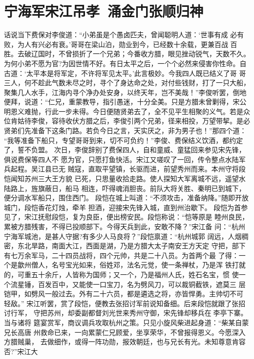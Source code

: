 \chapter{宁海军宋江吊孝~涌金门张顺归神}

话说当下费保对李俊道：“小弟虽是个愚卤匹夫，曾闻聪明人道：‘世事有成
必有败，为人有兴必有衰。’哥哥在梁山泊，勋业到今，已经数十余载，更兼百战
百胜。去破辽国时，不曾损折了一个兄弟；今番收方腊，眼见挫动锐气，天数不久。
为何小弟不愿为官?为因世情不好。有日太平之后，一个个必然来侵害你性命。自
古道：‘太平本是将军定，不许将军见太平。’此言极妙。今我四人既已结义了哥
哥三人，何不趁此气数未尽之时，寻个了身达命之处，对付些钱财，打了一只大船，
聚集几人水手，江海内寻个净办处安身，以终天年，岂不美哉！”李俊听罢，倒地
便拜，说道：“仁兄，重蒙教导，指引愚迷，十分全美。只是方腊未曾剿得，宋公
明恩义难抛，行此一步未得。今日便随贤弟去了，全不见平生相聚的义气。若是众
位肯姑待李俊，容待收伏方腊之后，李俊引两个兄弟，径来相投，万望带挈。是必
贤弟们先准备下这条门路。若负今日之言，天实厌之，非为男子也！”那四个道：
“我等准备下船只，专望哥哥到来，切不可负约！”李俊、费保结义饮酒，都约定
了，誓不负盟。
次日，李俊辞别了费保四人，自和童威、童猛回来参见宋先锋，俱说费保等四人不
愿为官，只愿打鱼快活。宋江又嗟叹了一回，传令整点水陆军兵起程。吴江县已无
贼寇，直取平望镇，长驱而进，前望秀州而来。本州守将段恺闻知苏州三大王方貌
已死，只思量收拾走路。使人探知大军离城不远，遥望水陆路上，旌旗蔽日，船马
相连，吓得魂消胆丧。前队大将关胜、秦明已到城下，便分调水军船只，围住西门。
段恺在城上叫道：“不须攻击，准备纳降。”随即开放城门，段恺香花灯烛，牵羊
担酒，迎接宋先锋入城，直到州治歇下。
段恺为首参见了，宋江抚慰段恺，复为良臣，便出榜安民。段恺称说：“恺等原是
睦州良民，累被方腊残害，不得已投顺部下。今得天兵到此，安敢不降？”宋江备
问：“杭州宁海军城池，是甚人守据?有多少人马良将？”段恺禀道：“杭州城郭
阔远，人烟稠密，东北旱路，南面大江，西面是湖，乃是方腊大太子南安王方天定
守把，部下有七万余军马，二十四员战将，四个元帅，共是二十八员。为首两个最
了得：一个是歙州僧人，名号宝光如来，俗姓邓，法名元觉，使一条禅杖，乃是浑
铁打就的，可重五十余斤，人皆称为国师；又一个，乃是福州人氏，姓石名宝，惯
使一个流星锤，百发百中，又能使一口宝刀，名为劈风刀，可以裁铜截铁，遮莫三
层铠甲，如劈风一般过去。外有二十六员，都是遴选之将，亦皆悍勇。主帅切不可
轻敌。”
宋江听罢，赏了段恺，便教去张招讨军前说知备细。后来段恺就跟了张招讨行军，
守把苏州，却委副都督刘光世来秀州守御，宋先锋却移兵在李亭下寨。当与诸将
筵宴赏军，商议调兵攻取杭州之策。只见小旋风柴进起身道：“柴某自蒙兄长高唐
州救命已来，一向累蒙仁兄顾爱，坐享荣华，不曾报得恩义。今愿深入方腊贼巢，
去做细作，或得一阵功勋，报效朝廷，也与兄长有光。未知尊意肯容否?”宋江大
